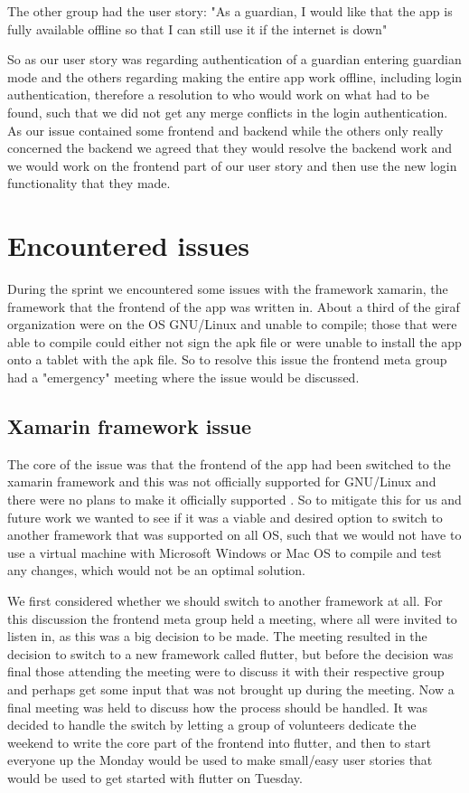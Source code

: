 The other group had the user story: "As a guardian, I would like that the app is fully available offline so that I can still use it if the internet is down"

So as our user story was regarding authentication of a guardian entering guardian mode and the others regarding making the entire app work offline, including login authentication, therefore a resolution to who would work on what had to be found, such that we did not get any merge conflicts in the login authentication. 
As our issue contained some frontend and backend while the others only really concerned the backend we agreed that they would resolve the backend work and we would work on the frontend part of our user story and then use the new login functionality that they made.

\section{Encountered issues}
During the sprint we encountered some issues with the framework xamarin, the framework that the frontend of the app was written in. 
About a third of the giraf organization were on the OS GNU/Linux and unable to compile; those that were able to compile could either not sign the apk file or were unable to install the app onto a tablet with the apk file.
So to resolve this issue the frontend meta group had a "emergency" meeting where the issue would be discussed.

\subsection{Xamarin framework issue}
The core of the issue was that the frontend of the app had been switched to the xamarin framework and this was not officially supported for GNU/Linux and there were no plans to make it officially supported \cite{xamarinSupport}.
So to mitigate this for us and future work we wanted to see if it was a viable and desired option to switch to another framework that was supported on all OS, such that we would not have to use a virtual machine with Microsoft Windows or Mac OS to compile and test any changes, which would not be an optimal solution.

We first considered whether we should switch to another framework at all.
For this discussion the frontend meta group held a meeting, where all were invited to listen in, as this was a big decision to be made.
The meeting resulted in the decision to switch to a new framework called flutter, but before the decision was final those attending the meeting were to discuss it with their respective group and perhaps get some input that was not brought up during the meeting.
Now a final meeting was held to discuss how the process should be handled.
It was decided to handle the switch by letting a group of volunteers dedicate the weekend to write the core part of the frontend into flutter, and then to start everyone up the Monday would be used to make small/easy user stories that would be used to get started with flutter on Tuesday.
